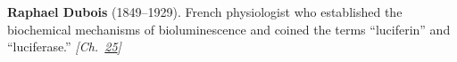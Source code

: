 \textbf{Raphael Dubois} (1849–1929). French physiologist who established the biochemical mechanisms of bioluminescence and coined the terms ``luciferin'' and ``luciferase.'' \emph{[Ch.~\hyperref[ch:fireflybioluminescence]{25}]}

